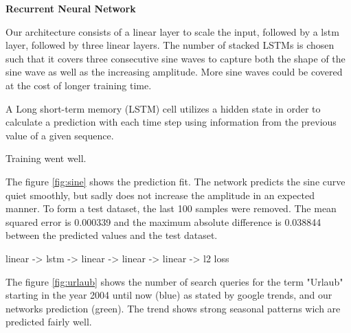 \documentclass{article}
\begin{document}
\begin{enumerate}
	
	\begin{item}
		\textbf{Recurrent Neural Network}
	\end{item}
	\begin{enumerate}
		
		\begin{item}
			Our architecture consists of a linear layer to scale the input, followed by a lstm layer, followed by three linear layers. The number of stacked LSTMs is chosen such that it covers three consecutive sine waves to capture both the shape of the sine wave as well as the increasing amplitude. More sine waves could be covered at the cost of longer training time.
		\end{item}
		
		
		
		\begin{item}
			A Long short-term memory (LSTM) cell utilizes a hidden state in order to calculate a prediction with each time step using information from the previous value of a given sequence.
			
		\end{item}
		
		\begin{item}
			Training went well.
		\end{item}
		
		\begin{item}
			The  figure \ref{fig:sine} shows the prediction fit. The network predicts the sine curve quiet smoothly, but sadly does not increase the amplitude in an expected manner. 
			To form a test dataset,  the last 100 samples were removed. 
			The mean squared error is 0.000339 and the maximum absolute difference is 0.038844 between the predicted values and the test dataset.
	
		\end{item}
		\begin{item}
			linear -> lstm -> linear -> linear -> linear -> l2 loss
		\end{item}
		
		\begin{item}
			The  figure \ref{fig:urlaub} shows the number of search queries for the term "Urlaub" starting in the year 2004 until now (blue) as stated by google trends, and our networks prediction (green). The trend shows strong seasonal patterns wich are predicted fairly well.
		\end{item}
	\end{enumerate}

	
\end{enumerate}
\end{document}
